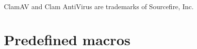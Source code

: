 \documentclass[a4paper,titlepage,12pt,english]{book}
\begin{document}
\vspace{0.3cm}
\noindent
\begin{boxedminipage}[b]{\textwidth}
    ClamAV and Clam AntiVirus are trademarks of Sourcefire, Inc.
\end{boxedminipage}
\setlength{\parindent}{18pt}
\mainmatter










\appendix
\chapter{Predefined macros}
\label{apdx:predefined}
\lstset{basicstyle=\tiny}

\backmatter

\end{document}
